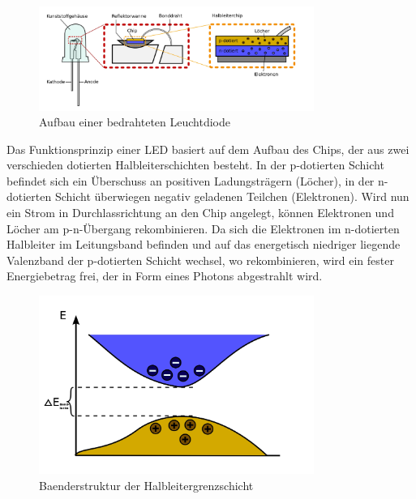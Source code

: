 \documentclass[11pt]{scrartcl}
\begin{document}
\begin{figure}[ht]
\begin{center}
\includegraphics[width=0.8\textwidth]{images/ledaufbau.jpg}
\end{center}
\vspace{-1.5\baselineskip}
\caption{Aufbau einer bedrahteten Leuchtdiode}
\label{LED-Aufbau}
\end{figure}

Das Funktionsprinzip einer LED basiert auf dem Aufbau des Chips, der aus zwei verschieden dotierten Halbleiterschichten besteht. In der p-dotierten Schicht befindet sich ein Überschuss an positiven Ladungsträgern (Löcher), in der n-dotierten Schicht überwiegen negativ geladenen Teilchen (Elektronen). Wird nun ein Strom in Durchlassrichtung an den Chip angelegt, können Elektronen und Löcher am p-n-Übergang rekombinieren. Da sich die Elektronen im n-dotierten Halbleiter im Leitungsband befinden und auf das energetisch niedriger liegende Valenzband der p-dotierten Schicht wechsel, wo rekombinieren, wird ein fester Energiebetrag frei, der in Form eines Photons abgestrahlt wird.

\begin{figure}[ht]
\begin{center}
\includegraphics[width=0.8\textwidth]{images/band.jpg}
\end{center}
\vspace{-1.5\baselineskip}
\caption{Baenderstruktur der Halbleitergrenzschicht}
\label{Baendermodell}
\end{figure}
\end{document}
